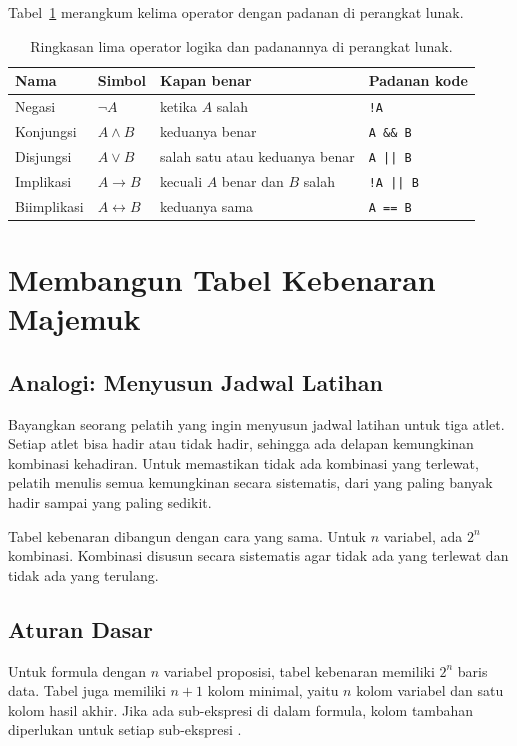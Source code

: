 \documentclass[11pt,a4paper]{article}
\begin{document}
Tabel~\ref{tab:lima-operator} merangkum kelima operator dengan padanan di perangkat lunak.

\begin{table}[H]
	\centering
	\caption{Ringkasan lima operator logika dan padanannya di perangkat lunak.}
	\label{tab:lima-operator}
	\small
	\begin{tabularx}{\textwidth}{l l X X}
		\toprule
		Nama & Simbol & Kapan benar & Padanan kode \\
		\midrule
		Negasi & $\neg A$ & ketika $A$ salah & \texttt{!A} \\
		Konjungsi & $A \wedge B$ & keduanya benar & \texttt{A \&\& B} \\
		Disjungsi & $A \vee B$ & salah satu atau keduanya benar & \texttt{A || B} \\
		Implikasi & $A \to B$ & kecuali $A$ benar dan $B$ salah & \texttt{!A || B} \\
		Biimplikasi & $A \leftrightarrow B$ & keduanya sama & \texttt{A == B} \\
		\bottomrule
	\end{tabularx}
\end{table}

\section{Membangun Tabel Kebenaran Majemuk}

\subsection{Analogi: Menyusun Jadwal Latihan}

Bayangkan seorang pelatih yang ingin menyusun jadwal latihan untuk tiga atlet. Setiap atlet bisa hadir atau tidak hadir, sehingga ada delapan kemungkinan kombinasi kehadiran. Untuk memastikan tidak ada kombinasi yang terlewat, pelatih menulis semua kemungkinan secara sistematis, dari yang paling banyak hadir sampai yang paling sedikit.

Tabel kebenaran dibangun dengan cara yang sama. Untuk $n$ variabel, ada $2^n$ kombinasi. Kombinasi disusun secara sistematis agar tidak ada yang terlewat dan tidak ada yang terulang.

\subsection{Aturan Dasar}

Untuk formula dengan $n$ variabel proposisi, tabel kebenaran memiliki $2^n$ baris data. Tabel juga memiliki $n+1$ kolom minimal, yaitu $n$ kolom variabel dan satu kolom hasil akhir. Jika ada sub-ekspresi di dalam formula, kolom tambahan diperlukan untuk setiap sub-ekspresi \cite{rosen}.
\end{document}
